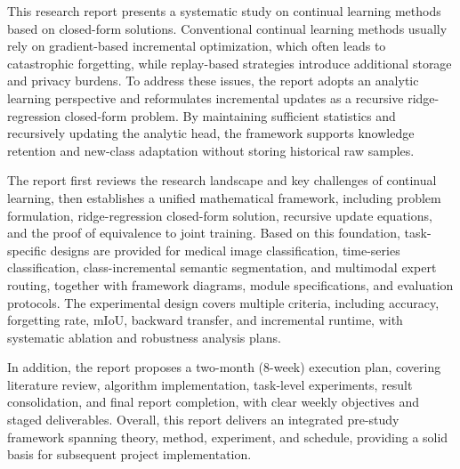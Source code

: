 

\begin{abstracten}

This research report presents a systematic study on continual learning methods based on closed-form solutions. Conventional continual learning methods usually rely on gradient-based incremental optimization, which often leads to catastrophic forgetting, while replay-based strategies introduce additional storage and privacy burdens. To address these issues, the report adopts an analytic learning perspective and reformulates incremental updates as a recursive ridge-regression closed-form problem. By maintaining sufficient statistics and recursively updating the analytic head, the framework supports knowledge retention and new-class adaptation without storing historical raw samples.

The report first reviews the research landscape and key challenges of continual learning, then establishes a unified mathematical framework, including problem formulation, ridge-regression closed-form solution, recursive update equations, and the proof of equivalence to joint training. Based on this foundation, task-specific designs are provided for medical image classification, time-series classification, class-incremental semantic segmentation, and multimodal expert routing, together with framework diagrams, module specifications, and evaluation protocols. The experimental design covers multiple criteria, including accuracy, forgetting rate, mIoU, backward transfer, and incremental runtime, with systematic ablation and robustness analysis plans.

In addition, the report proposes a two-month (8-week) execution plan, covering literature review, algorithm implementation, task-level experiments, result consolidation, and final report completion, with clear weekly objectives and staged deliverables. Overall, this report delivers an integrated pre-study framework spanning theory, method, experiment, and schedule, providing a solid basis for subsequent project implementation.

\end{abstracten}
